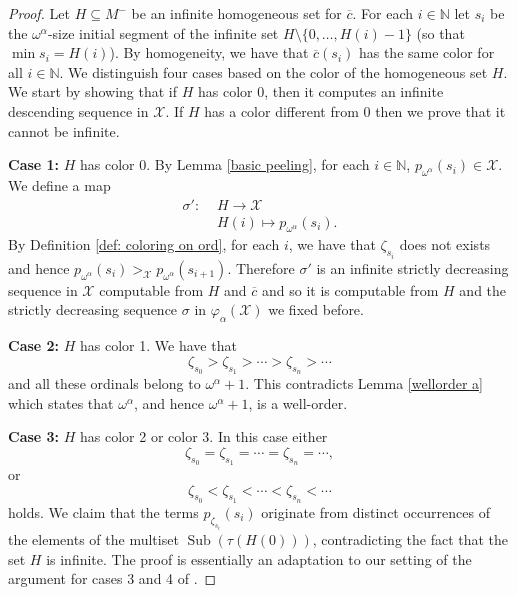 \documentclass[11pt]{amsart}
\theoremstyle{definition}
\theoremstyle{remark}
\theoremstyle{plain}
\newcommand{\numberset}{\mathbb}
\newcommand{\N}{\numberset{N}}
\newcommand{\Sub}{\operatorname{Sub}}
\def\X{\mathcal{X}}
\def\om{\omega}
\def\a{\alpha}
\def\z{\zeta}
\def\N{{\mathbb{N}}}
\newcommand{\lorenzo}[1]{\textcolor{blue}{#1}}
\newcommand{\andrea}[1]{\textcolor{green}{#1}}
\begin{document}
\begin{proof}
Let $H\subseteq M^-$ be an infinite homogeneous set for $\overline{c}$.
For each $i\in\N$ let $s_i$ be the $\om^\a$-size initial segment of the infinite set $H \setminus \{0, \ldots, H(i)-1\}$ (so that $\min s_i = H(i)$).
By homogeneity, we have that $\overline{c} (s_i)$ has the same color for all $i \in \N$.
We distinguish four cases based on the color of the homogeneous set $H$.
We start by showing that if $H$ has color 0, then it computes an infinite descending sequence in $\X$.
If $H$ has a color different from 0 then we prove that it cannot be infinite.

\medskip

\textbf{Case 1:} $H$ has color 0.
By Lemma \ref{basic peeling}, for each $i\in\N$, $p_{\om^\a}(s_i) \in \X$.
We define a map
\begin{align*}
    \sigma' \colon & \,\, H \to \X \\
    & \,\, H(i) \mapsto p_{\om^\a}(s_i).  
\end{align*}
By Definition \ref{def: coloring on ord}, for each $i$, we have that $\z_{s_i}$ does not exists and hence $p_{\om^\a} (s_i) >_\X p_{\om^\a}(s_{i+1})$.
Therefore $\sigma'$ is an infinite strictly decreasing sequence in $\X$ computable from $H$ and $\overline{c}$ and so it is computable from $H$ and the strictly decreasing sequence $\sigma$ in $\varphi_\a(\X)$ we fixed before.

\medskip

\textbf{Case 2:} $H$ has color 1.
We have that
$$\z_{s_0} > \z_{s_1} > \cdots > \z_{s_n} > \cdots$$
and all these ordinals belong to $\om^\a + 1$.
This contradicts Lemma \ref{wellorder a} which states that $\om^\a$, and hence $\om^\a+1$, is a well-order.

\medskip

\textbf{Case 3:} $H$ has color 2 or color 3.
In this case either
$$\z_{s_0} = \z_{s_1} = \cdots = \z_{s_n} = \cdots,$$
or
$$\z_{s_0} < \z_{s_1} < \cdots < \z_{s_n} < \cdots$$
holds. 
We claim that the terms $p_{\z_{s_i}} (s_i)$ originate from distinct occurrences of the elements of the multiset $\Sub (\tau(H(0)))$, contradicting the fact that the set $H$ is infinite.
The proof is essentially an adaptation to our setting of the argument for cases 3 and 4 of \cite[Theorem 6.1]{marcone2025}.
\end{proof}
\end{document}
